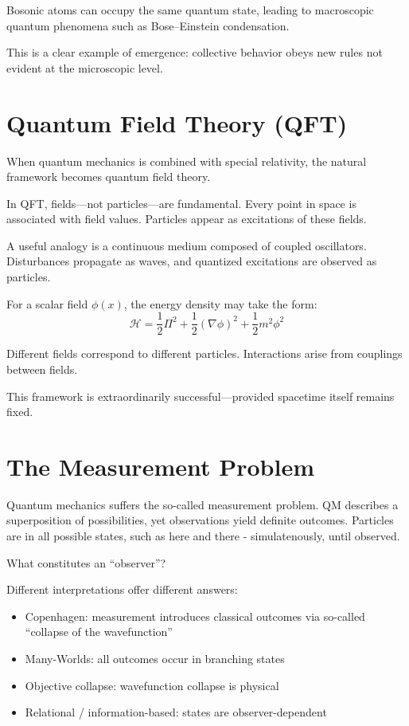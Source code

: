 Bosonic atoms can occupy the same quantum state, leading to macroscopic quantum phenomena such as Bose–Einstein condensation.

This is a clear example of emergence: collective behavior obeys new rules not evident at the microscopic level.

\section{Quantum Field Theory (QFT)}

When quantum mechanics is combined with special relativity, the natural framework becomes quantum field theory.

In QFT, fields—not particles—are fundamental. Every point in space is associated with field values. Particles appear as excitations of these fields.

A useful analogy is a continuous medium composed of coupled oscillators. Disturbances propagate as waves, and quantized excitations are observed as particles.

For a scalar field $\phi(x)$, the energy density may take the form:
\[
\mathcal{H} = \frac{1}{2} \Pi^2 + \frac{1}{2} (\nabla \phi)^2 + \frac{1}{2} m^2 \phi^2
\]

Different fields correspond to different particles. Interactions arise from couplings between fields.

This framework is extraordinarily successful—provided spacetime itself remains fixed.


\section{The Measurement Problem}

Quantum mechanics suffers the so-called measurement problem. QM describes a superposition of possibilities, yet observations yield definite outcomes. Particles are in all possible states, such as here and there - simulatenously, until observed.

What constitutes an “observer”?

Different interpretations offer different answers:

\begin{itemize}
\item Copenhagen: measurement introduces classical outcomes via so-called ``collapse of the wavefunction''
\item Many-Worlds: all outcomes occur in branching states
\item Objective collapse: wavefunction collapse is physical
\item Relational / information-based: states are observer-dependent
\end{itemize}

